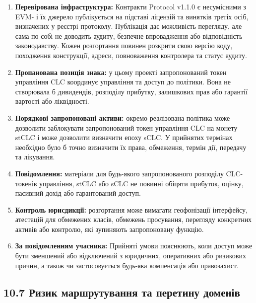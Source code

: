 \documentclass[11pt]{article}
\begin{document}
\begin{enumerate}[leftmargin=*]
\item \textbf{Перевірована інфраструктура:} Контракти Protocol v1.1.0 є несумісними з EVM- і їх джерело публікується на підставі ліцензій та винятків третіх осіб, визначених у реєстрі протоколу. Публікація дає можливість перегляду, але сама по собі не доводить аудиту, безпечне впровадження або відповідність законодавству. Кожен розгортання повинен розкрити свою версію коду, походження конструкції, адреси, повноваження контролера та статус аудиту.
\item \textbf{Пропанована позиція знака:} у цьому проекті запропонований токен управління CLC координує управління та доступ до політики. Вона не створювала б дивидендів, розподілу прибутку, залишкових прав або гарантії вартості або ліквідності.
\item \textbf{Порядкові запропоновані активи:} окремо реалізована політика може дозволити заблокувати запропонований токен управління CLC на монету stCLC і може дозволити визначити епоху sCLC. У прийнятих термінах необхідно було б точно визначити їх права, обмеження, термін дії, передачу та лікування.
\item \textbf{Повідомлення:} матеріали для будь-якого запропонованого розподілу CLC-токенів управління, stCLC або sCLC не повинні обіцяти прибуток, оцінку, пасивний дохід або гарантований доступ.
\item \textbf{Контроль юрисдикції:} розгортання може вимагати геофонізації інтерфейсу, атестацій для обмежених класів, обмежень просування, перегляду конкретних активів або контролю, які зупиняють запропоновану функцію.
\item \textbf{За повідомленням учасника:} Прийняті умови пояснюють, коли доступ може бути зменшений або відключений з юридичних, оперативних або ризикових причин, а також чи застосовується будь-яка компенсація або правозахист.
\end{enumerate}
\subsection*{10.7 Ризик маршрутування та перетину доменів}
\end{document}
